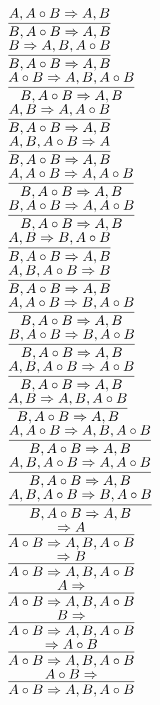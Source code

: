 \documentclass[11pt]{article}
\begin{document}
\begin{center}
\bigskip
\\$\infer{B, A\circ B\Rightarrow A, B}{A, A\circ B\Rightarrow A, B}$
\bigskip
\\$\infer{B, A\circ B\Rightarrow A, B}{B\Rightarrow A, B, A\circ B}$
\bigskip
\\$\infer{B, A\circ B\Rightarrow A, B}{A\circ B\Rightarrow A, B, A\circ B}$
\bigskip
\\$\infer{B, A\circ B\Rightarrow A, B}{A, B\Rightarrow A, A\circ B}$
\bigskip
\\$\infer{B, A\circ B\Rightarrow A, B}{A, B, A\circ B\Rightarrow A}$
\bigskip
\\$\infer{B, A\circ B\Rightarrow A, B}{A, A\circ B\Rightarrow A, A\circ B}$
\bigskip
\\$\infer{B, A\circ B\Rightarrow A, B}{B, A\circ B\Rightarrow A, A\circ B}$
\bigskip
\\$\infer{B, A\circ B\Rightarrow A, B}{A, B\Rightarrow B, A\circ B}$
\bigskip
\\$\infer{B, A\circ B\Rightarrow A, B}{A, B, A\circ B\Rightarrow B}$
\bigskip
\\$\infer{B, A\circ B\Rightarrow A, B}{A, A\circ B\Rightarrow B, A\circ B}$
\bigskip
\\$\infer{B, A\circ B\Rightarrow A, B}{B, A\circ B\Rightarrow B, A\circ B}$
\bigskip
\\$\infer{B, A\circ B\Rightarrow A, B}{A, B, A\circ B\Rightarrow A\circ B}$
\bigskip
\\$\infer{B, A\circ B\Rightarrow A, B}{A, B\Rightarrow A, B, A\circ B}$
\bigskip
\\$\infer{B, A\circ B\Rightarrow A, B}{A, A\circ B\Rightarrow A, B, A\circ B}$
\bigskip
\\$\infer{B, A\circ B\Rightarrow A, B}{A, B, A\circ B\Rightarrow A, A\circ B}$
\bigskip
\\$\infer{B, A\circ B\Rightarrow A, B}{A, B, A\circ B\Rightarrow B, A\circ B}$
\bigskip
\\$\infer{A\circ B\Rightarrow A, B, A\circ B}{\Rightarrow A}$
\bigskip
\\$\infer{A\circ B\Rightarrow A, B, A\circ B}{\Rightarrow B}$
\bigskip
\\$\infer{A\circ B\Rightarrow A, B, A\circ B}{A\Rightarrow }$
\bigskip
\\$\infer{A\circ B\Rightarrow A, B, A\circ B}{B\Rightarrow }$
\bigskip
\\$\infer{A\circ B\Rightarrow A, B, A\circ B}{\Rightarrow A\circ B}$
\bigskip
\\$\infer{A\circ B\Rightarrow A, B, A\circ B}{A\circ B\Rightarrow }$

\end{center}
\end{document}
